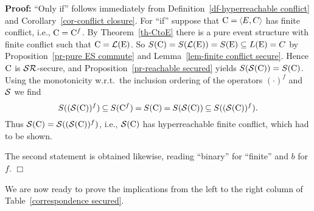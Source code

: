 \documentclass[twocolumn]{article}
\newenvironment{proof}{\begin{trivlist} \item[\hspace{\labelsep}\bf
Proof:]}{\hfill $\Box$\end{trivlist}}
\newcommand{\df}[1]{Definition~\ref{df-#1}}
\newcommand{\thm}[1]{Theorem~\ref{th-#1}}
\newcommand{\pr}[1]{Proposition~\ref{pr-#1}}
\newcommand{\lem}[1]{Lemma~\ref{lem-#1}}
\newcommand{\cor}[1]{Corollary~\ref{cor-#1}}
\begin{document}
\begin{proof}
``Only if'' follows immediately from \df{hyperreachable conflict} and
\cor{conflict closure}. For ``if'' suppose that $\eC=\tuple{E,C}$ has
finite conflict, i.e., ${\rm C} = {\rm C}^f$. By \thm{CtoE} there is a pure
 event structure with finite conflict such that ${\rm C} = {\cal L}({\rm E})$.
So $S({\rm C})=S({\cal L}({\rm E}))=S({\rm E})\subseteq L({\rm E}) = C$
by \pr{pure ES commute} and \lem{finite conflict secure}.
Hence ${\rm C}$ is ${\cal S}{\cal R}$-secure, and \pr{reachable secured} yields
$S({\cal S}({\rm C}))=S({\rm C})$. Using the monotonicity w.r.t.\
the inclusion ordering of the operators $(\cdot)^f$ and ${\cal S}$ we find
$$S(({\cal S}({\rm C}))^f)\hspace{-.55pt}\subseteq\hspace{-.55pt} S({\rm C}^f)
\hspace{-.55pt}=\hspace{-.55pt} S({\rm C}) \hspace{-.55pt}=\hspace{-.55pt}
S({\cal S}({\rm C})) \hspace{-.55pt}\subseteq\hspace{-.55pt} S(({\cal S}({\rm C}))^f).$$
Thus ${\cal S}({\rm C}) = {\cal S}(({\cal S}({\rm C}))^f)$, i.e.,
${\cal S}({\rm C})$ has hyperreachable finite conflict, which had to be shown.

The second statement is obtained likewise, reading ``binary'' for
``finite'' and $b$ for $f$.
\end{proof}
We are now ready to prove the implications from the left to the right
column of Table~\ref{correspondence secured}.
\end{document}

